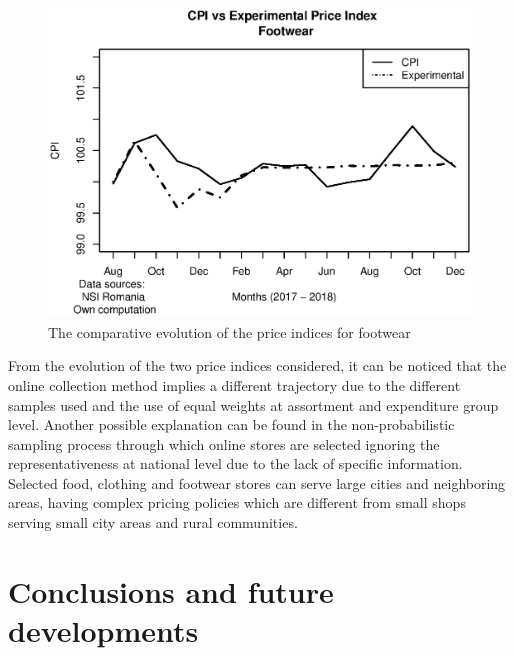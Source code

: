 \documentclass[]{article}
\begin{document}
\begin{figure}
\centering
\includegraphics[width=0.7\linewidth]{fig5.eps}
\caption{The comparative evolution of the price indices for footwear}
\label{fig:5}
\end{figure}


From the evolution of the two price indices considered, it can be noticed that the online 
collection method implies a different trajectory due to the different samples used and the use 
of equal weights at assortment and expenditure group level. Another possible explanation can be found 
in the non-probabilistic sampling process through which online stores are selected ignoring the 
representativeness at national level due to the lack of specific information. Selected food, 
clothing and footwear stores can serve large cities and neighboring areas, having complex pricing 
policies which are different from small shops serving small city areas and rural communities.


\section{Conclusions and future developments}\label{conclusions}
\end{document}
